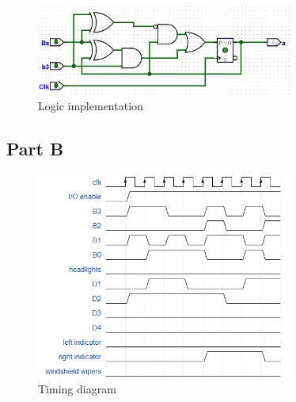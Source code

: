 \documentclass{article}
\begin{document}
\begin{figure}[H]
    \centering
    \includegraphics[width=0.75\textwidth]{./images/problem3_circ2.png}
    \caption{Logic implementation}
\end{figure}

\subsection*{Part B}
\begin{figure}[H]
    \centering
    \includegraphics[width=0.75\textwidth]{./images/wavetable.png}
    \caption{Timing diagram}
\end{figure}
\end{document}
